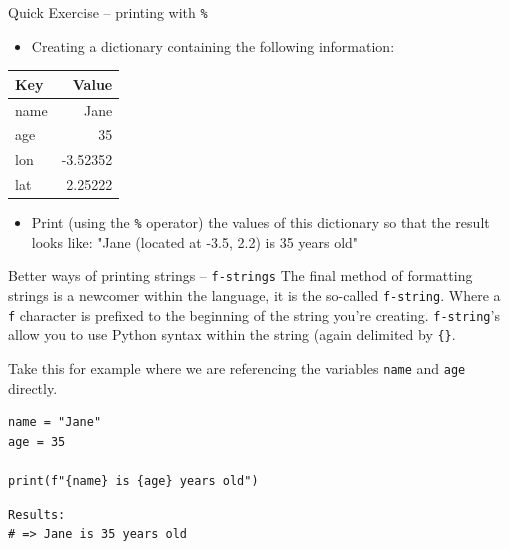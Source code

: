 \documentclass[10pt]{beamer}
\begin{document}
\begin{frame}[label={sec:org56ae486},fragile]{Quick Exercise -- printing with \texttt{\%}}
 \begin{itemize}
\item Creating a dictionary containing the following information:
\end{itemize}

\begin{center}
\begin{tabular}{lr}
\toprule
Key & Value\\
\midrule
name & Jane\\
age & 35\\
lon & -3.52352\\
lat & 2.25222\\
\bottomrule
\end{tabular}
\end{center}

\begin{itemize}
\item Print (using the \texttt{\%} operator) the values of this dictionary so that the result looks
like: "Jane (located at -3.5, 2.2) is 35 years old"
\end{itemize}
\end{frame}

\begin{frame}[label={sec:org0ad1005},fragile]{Better ways of printing strings -- \texttt{f-strings}}
 The final method of formatting strings is a newcomer within the language, it is the
so-called \texttt{f-string}. Where a \texttt{f} character is prefixed to the beginning of the string
you're creating. \texttt{f-string}'s allow you to use Python syntax within the string (again
delimited by \texttt{\{\}}.

Take this for example where we are referencing the variables \texttt{name} and \texttt{age} directly.

\begin{verbatim}
name = "Jane"
age = 35

print(f"{name} is {age} years old")
\end{verbatim}

\begin{verbatim}
Results: 
# => Jane is 35 years old
\end{verbatim}
\end{frame}
\end{document}
